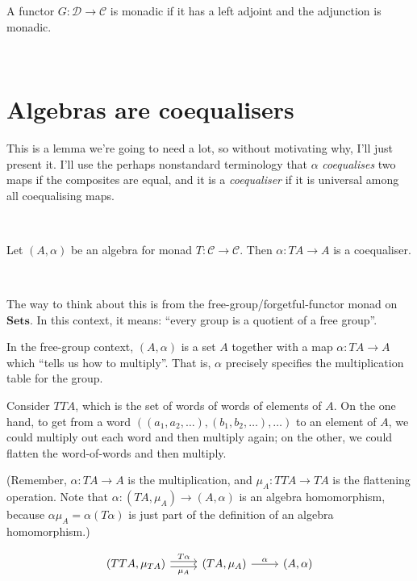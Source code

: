 \documentclass[11pt]{amsart}
\begin{document}
\begin{defn}
A functor $G: \mathcal{D} \to \mathcal{C}$ is monadic if it has a left adjoint and the adjunction is monadic.
\end{defn}

\

\section{Algebras are coequalisers} \label{coeq}

This is a lemma we're going to need a lot, so without motivating why, I'll just present it.
I'll use the perhaps nonstandard terminology that $\alpha$ \emph{coequalises} two maps if the composites are equal, and it is a \emph{coequaliser} if it is universal among all coequalising maps.

\

\begin{thm}
Let $(A, \alpha)$ be an algebra for monad $T: \mathcal{C} \to \mathcal{C}$.
Then $\alpha: TA \to A$ is a coequaliser.
\end{thm}

\

The way to think about this is from the free-group/forgetful-functor monad on $\mathbf{Sets}$.
In this context, it means: ``every group is a quotient of a free group''.

In the free-group context, $(A, \alpha)$ is a set $A$ together with a map $\alpha: TA \to A$ which ``tells us how to multiply''.
That is, $\alpha$ precisely specifies the multiplication table for the group.

Consider $TTA$, which is the set of words of words of elements of $A$.
On the one hand, to get from a word $((a_1, a_2, \dots), (b_1, b_2, \dots), \dots)$ to an element of $A$, we could multiply out each word and then multiply again;
on the other, we could flatten the word-of-words and then multiply.

(Remember, $\alpha: TA \to A$ is the multiplication, and $\mu_A: TTA \to TA$ is the flattening operation.
Note that $\alpha: (TA, \mu_A) \to (A, \alpha)$ is an algebra homomorphism, because $\alpha \mu_A = \alpha (T \alpha)$ is just part of the definition of an algebra homomorphism.)

\[
\begin{tikzcd}
(TTA, \mu_{TA}) \arrow[r, shift left, "T\alpha"] \arrow[r, shift right, "\mu_A"']
& (TA, \mu_A) \arrow[r, "\alpha"]
& (A, \alpha)
\end{tikzcd}
\]
\end{document}
